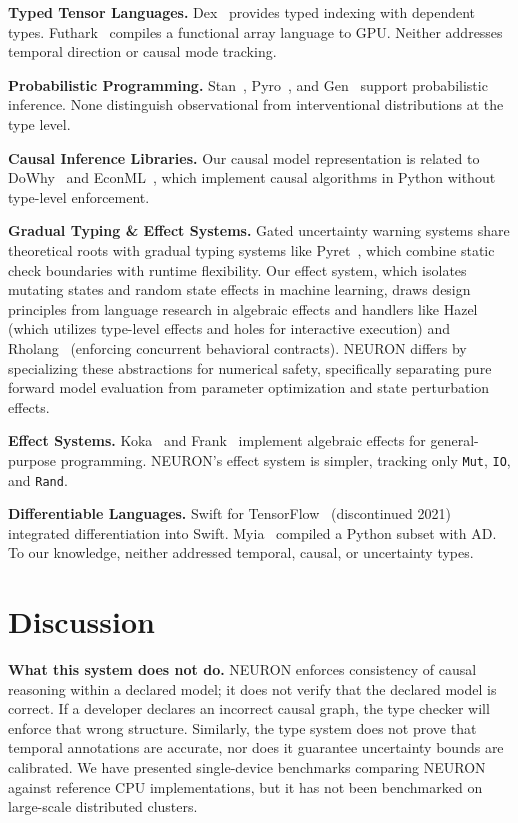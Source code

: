\documentclass[11pt,a4paper]{article}
\newcommand{\ty}[1]{\texttt{#1}}
\begin{document}
\textbf{Typed Tensor Languages.} Dex~\cite{paszke2021dex} provides typed indexing with dependent types. Futhark~\cite{henriksen2017} compiles a functional array language to GPU. Neither addresses temporal direction or causal mode tracking.

\textbf{Probabilistic Programming.} Stan~\cite{carpenter2017}, Pyro~\cite{bingham2019}, and Gen~\cite{cusumano2019} support probabilistic inference. None distinguish observational from interventional distributions at the type level.

\textbf{Causal Inference Libraries.} Our causal model representation is related to DoWhy~\cite{sharma2020} and EconML~\cite{battocchi2019}, which implement causal algorithms in Python without type-level enforcement.

\textbf{Gradual Typing \& Effect Systems.} Gated uncertainty warning systems share theoretical roots with gradual typing systems like Pyret~\cite{pyret2016}, which combine static check boundaries with runtime flexibility. Our effect system, which isolates mutating states and random state effects in machine learning, draws design principles from language research in algebraic effects and handlers like Hazel~\cite{hazel2018} (which utilizes type-level effects and holes for interactive execution) and Rholang~\cite{rholang2017} (enforcing concurrent behavioral contracts). NEURON differs by specializing these abstractions for numerical safety, specifically separating pure forward model evaluation from parameter optimization and state perturbation effects.

\textbf{Effect Systems.} Koka~\cite{leijen2017} and Frank~\cite{lindley2017} implement algebraic effects for general-purpose programming. NEURON's effect system is simpler, tracking only \ty{Mut}, \ty{IO}, and \ty{Rand}.

\textbf{Differentiable Languages.} Swift for TensorFlow~\cite{wei2019} (discontinued 2021) integrated differentiation into Swift. Myia~\cite{vanmerrienboer2019} compiled a Python subset with AD. To our knowledge, neither addressed temporal, causal, or uncertainty types.


\section{Discussion}

\textbf{What this system does not do.} NEURON enforces consistency of causal reasoning within a declared model; it does not verify that the declared model is correct. If a developer declares an incorrect causal graph, the type checker will enforce that wrong structure. Similarly, the type system does not prove that temporal annotations are accurate, nor does it guarantee uncertainty bounds are calibrated. We have presented single-device benchmarks comparing NEURON against reference CPU implementations, but it has not been benchmarked on large-scale distributed clusters.
\end{document}
